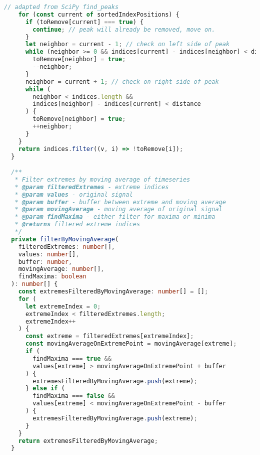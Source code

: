 \begin{lstlisting}[language=Typescript]
    // adapted from SciPy find_peaks
    for (const current of sortedIndexPositions) {
      if (toRemove[current] === true) {
        continue; // peak will already be removed, move on.
      }
      let neighbor = current - 1; // check on left side of peak
      while (neighbor >= 0 && indices[current] - indices[neighbor] < distance) {
        toRemove[neighbor] = true;
        --neighbor;
      }
      neighbor = current + 1; // check on right side of peak
      while (
        neighbor < indices.length &&
        indices[neighbor] - indices[current] < distance
      ) {
        toRemove[neighbor] = true;
        ++neighbor;
      }
    }
    return indices.filter((v, i) => !toRemove[i]);
  }

  /**
   * Filter extremes by moving average of timeseries
   * @param filteredExtremes - extreme indices
   * @param values - original signal
   * @param buffer - buffer between extreme and moving average
   * @param movingAverage - moving average of original signal
   * @param findMaxima - either filter for maxima or minima
   * @returns filtered extreme indices
   */
  private filterByMovingAverage(
    filteredExtremes: number[],
    values: number[],
    buffer: number,
    movingAverage: number[],
    findMaxima: boolean
  ): number[] {
    const extremesFilteredByMovingAverage: number[] = [];
    for (
      let extremeIndex = 0;
      extremeIndex < filteredExtremes.length;
      extremeIndex++
    ) {
      const extreme = filteredExtremes[extremeIndex];
      const movingAverageOnExtremePoint = movingAverage[extreme];
      if (
        findMaxima === true &&
        values[extreme] > movingAverageOnExtremePoint + buffer
      ) {
        extremesFilteredByMovingAverage.push(extreme);
      } else if (
        findMaxima === false &&
        values[extreme] < movingAverageOnExtremePoint - buffer
      ) {
        extremesFilteredByMovingAverage.push(extreme);
      }
    }
    return extremesFilteredByMovingAverage;
  }


\end{lstlisting}
